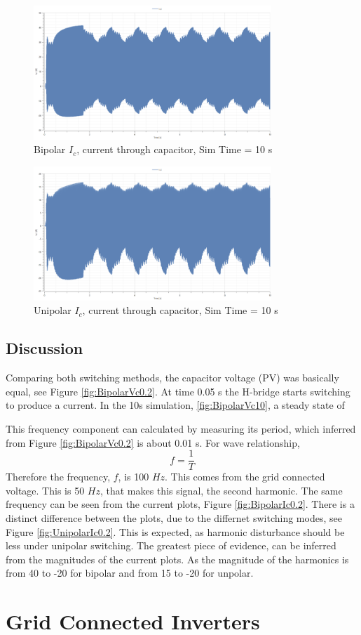 \documentclass[12pt,twoside]{scrartcl}
\begin{document}
\begin{figure}[htp]
    \centering
    \includegraphics[width=0.8\textwidth]{Bipolar_Ic_10.png}
    \caption{Bipolar $I_c$, current through capacitor, Sim Time = 10 s}
    \label{fig:BipolarIc10}
\end{figure}
\begin{figure}[htp]
    \centering
    \includegraphics[width=0.8\textwidth]{Unipolar_Ic_10.png}
    \caption{Unipolar $I_c$, current through capacitor, Sim Time = 10 s}
    \label{fig:UnipolarIc10}
\end{figure}
\newpage
\subsection{Discussion}
Comparing both switching methods, the capacitor voltage (PV) was basically equal, see Figure \ref{fig:BipolarVc0.2}. 
At time 0.05 s the H-bridge starts switching to produce a current. In the 10s simulation,  \ref{fig:BipolarVc10},
a steady state of 

This frequency component can 
calculated by measuring its period, which inferred from Figure \ref{fig:BipolarVc0.2} is about 0.01 s. For wave relationship,
\begin{equation}
    f = \dfrac{1}{T}
\end{equation}
Therefore the frequency, $f$, is 100 $Hz$. This comes 
from the grid connected voltage. This is 50 $Hz$,
that makes this signal, the second harmonic. The same frequency can 
be seen from the current plots, Figure \ref{fig:BipolarIc0.2}.
There is a distinct difference between the plots, due to the differnet switching modes, 
see Figure \ref{fig:UnipolarIc0.2}. This is expected, as 
harmonic disturbance should be less under unipolar switching. The greatest piece of 
evidence, can be inferred from the magnitudes of the current plots. 
As the magnitude of the harmonics is from 40 to -20
for bipolar and from 15 to -20 for unpolar. 


\section{Grid Connected Inverters}



\newpage


\end{document}
